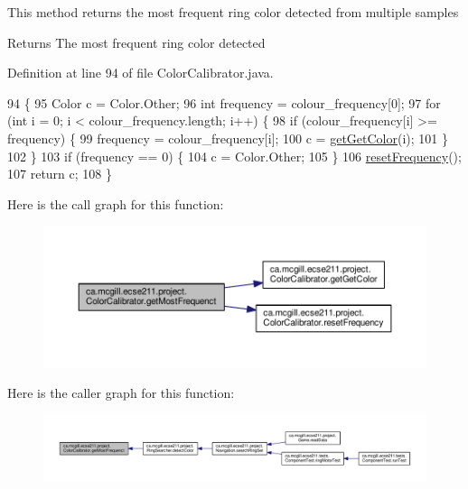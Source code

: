 This method returns the most frequent ring color detected from multiple samples

\begin{DoxyReturn}{Returns}
The most frequent ring color detected 
\end{DoxyReturn}


Definition at line 94 of file Color\+Calibrator.\+java.


\begin{DoxyCode}
94                                          \{
95     Color c = Color.Other;
96     \textcolor{keywordtype}{int} frequency = colour\_frequency[0];
97     \textcolor{keywordflow}{for} (\textcolor{keywordtype}{int} i = 0; i < colour\_frequency.length; i++) \{
98       \textcolor{keywordflow}{if} (colour\_frequency[i] >= frequency) \{
99         frequency = colour\_frequency[i];
100         c = \hyperlink{classca_1_1mcgill_1_1ecse211_1_1project_1_1_color_calibrator_acb1d9cef0739971dbe00cc16712be0fe}{getGetColor}(i);
101       \}
102     \}
103     \textcolor{keywordflow}{if} (frequency == 0) \{
104       c = Color.Other;
105     \}
106     \hyperlink{classca_1_1mcgill_1_1ecse211_1_1project_1_1_color_calibrator_ab6148d75e3a105016580e90ed1ea9bc9}{resetFrequency}();
107     \textcolor{keywordflow}{return} c;
108   \}
\end{DoxyCode}
Here is the call graph for this function\+:\nopagebreak
\begin{figure}[H]
\begin{center}
\leavevmode
\includegraphics[width=350pt]{classca_1_1mcgill_1_1ecse211_1_1project_1_1_color_calibrator_a3d65927aaa2041f933dbdc19c3d2a412_cgraph}
\end{center}
\end{figure}
Here is the caller graph for this function\+:
\nopagebreak
\begin{figure}[H]
\begin{center}
\leavevmode
\includegraphics[width=350pt]{classca_1_1mcgill_1_1ecse211_1_1project_1_1_color_calibrator_a3d65927aaa2041f933dbdc19c3d2a412_icgraph}
\end{center}
\end{figure}
